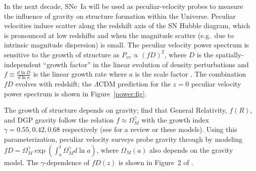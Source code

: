 \documentclass[11pt, oneside]{article}   	%
\begin{document}
In the next decade, SNe~Ia will be used as peculiar-velocity probes to measure  the influence of gravity on structure formation within the Universe.
Peculiar velocities induce scatter along the redshift axis of the SN Hubble diagram, which is
pronounced at low redshifts and when the magnitude scatter (e.g.\ due to intrinsic magnitude dispersion) is small.
The peculiar velocity power spectrum is sensitive to the growth of structure as $P_{vv}\propto (fD)^2$, where $D$ is  the spatially-independent
``growth factor'' in the linear evolution of density perturbations and
$f \equiv \frac{d\ln{D}}{d\ln{a}}$ is the linear growth rate where $a$ is the scale factor  \cite{2006PhRvD..73l3526H,2011ApJ...741...67D}.
The combination $fD$ evolves with redshift;
the $\Lambda$CDM prediction for the $z=0$ peculiar velocity power spectrum is shown in Figure~\ref{power:fig}.

The  growth of structure depends on gravity;
\cite{2007APh....28..481L} find that General Relativity, $f(R)$,  and DGP gravity follow the relation
$f \approx \Omega_M^\gamma$ with the growth index $\gamma=0.55, 0.42, 0.68$ respectively (see \cite{HUTERER201523} for a review
or these  models).  
Using this parameterization, peculiar velocity
surveys probe  gravity through by modeling $fD=\Omega_M^{\gamma} \exp{\left(\int_a^1 \Omega_M^{\gamma} d\ln{a} \right)}$,
where $\Omega_M(a)$ also depends on the gravity model.
The  $\gamma$-dependence of $fD(z)$ is shown 
in Figure~2 of  \cite{1475-7516-2013-04-031}.

%
\end{document}
